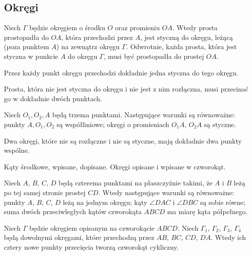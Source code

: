 \subsection{Okręgi}

\begin{proposition}
    Niech $\Gamma$ będzie okręgiem o środku $O$ oraz promieniu $OA$.
    Wtedy prosta prostopadła do $OA$, która przechodzi przez $A$, jest styczną do okręgu, leżącą (poza punktem $A$) na zewnątrz okręgu $\Gamma$.
    Odwrotnie, każda prosta, która jest styczna w punkcie $A$ do okręgu $\Gamma$, musi być prostopadła do prostej $OA$.
\end{proposition} %

\begin{corollary}
    Przez każdy punkt okręgu przechodzi dokładnie jedna styczna do tego okręgu.
\end{corollary} %

\begin{corollary}
    Prosta, która nie jest styczna do okręgu i nie jest z nim rozłączna, musi przecinać go w dokładnie dwóch punktach.
\end{corollary} %

\begin{proposition}
    Niech $O_1, O_2, A$ będą trzema punktami.
    Następujące warunki są równoważne: punkty $A, O_1, O_2$ są współliniowe; okręgi o promieniach $O_1A$, $O_2A$ są styczne.
\end{proposition} %

\begin{corollary}
    Dwa okręgi, które nie są rozłączne i nie są styczne, mają dokładnie dwa punkty wspólne.
\end{corollary} %


Kąty środkowe, wpisane, dopisane.
Okręgi opisane i wpisane w czworokąt.

\begin{proposition}
	Niech $A$, $B$, $C$, $D$ będą czterema punktami na płaszczyźnie takimi, że $A$ i $B$ leżą po tej samej stronie prostej $CD$.
	Wtedy następujące warunki są równoważne: punkty $A$, $B$, $C$, $D$ leżą na jednym okręgu; kąty $\angle DAC$ i $\angle DBC$ są sobie równe; suma dwóch przeciwległych kątów czworokąta $ABCD$ ma miarę kąta półpełnego.
\end{proposition}

\begin{proposition}
	Niech $\Gamma$ będzie okręgiem opisanym na czworokącie $ABCD$.
	Niech $\Gamma_1$, $\Gamma_2$, $\Gamma_3$, $\Gamma_4$ będą dowolnymi okręgami, które przechodzą przez $AB$, $BC$, $CD$, $DA$.
	Wtedy ich cztery nowe punkty przecięcia tworzą czworokąt cykliczny.
\end{proposition}


